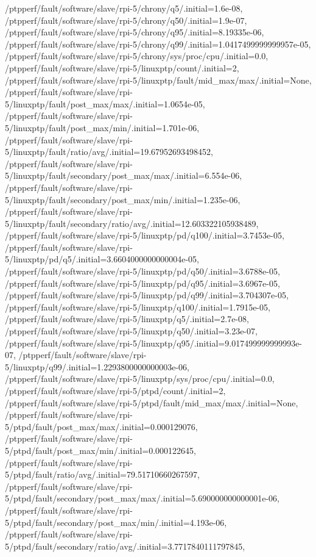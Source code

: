 {    /ptpperf/fault/software/slave/rpi-5/chrony/q5/.initial=1.6e-08,
    /ptpperf/fault/software/slave/rpi-5/chrony/q50/.initial=1.9e-07,
    /ptpperf/fault/software/slave/rpi-5/chrony/q95/.initial=8.19335e-06,
    /ptpperf/fault/software/slave/rpi-5/chrony/q99/.initial=1.0417499999999957e-05,
    /ptpperf/fault/software/slave/rpi-5/chrony/sys/proc/cpu/.initial=0.0,
    /ptpperf/fault/software/slave/rpi-5/linuxptp/count/.initial=2,
    /ptpperf/fault/software/slave/rpi-5/linuxptp/fault/mid_max/max/.initial=None,
    /ptpperf/fault/software/slave/rpi-5/linuxptp/fault/post_max/max/.initial=1.0654e-05,
    /ptpperf/fault/software/slave/rpi-5/linuxptp/fault/post_max/min/.initial=1.701e-06,
    /ptpperf/fault/software/slave/rpi-5/linuxptp/fault/ratio/avg/.initial=19.67952693498452,
    /ptpperf/fault/software/slave/rpi-5/linuxptp/fault/secondary/post_max/max/.initial=6.554e-06,
    /ptpperf/fault/software/slave/rpi-5/linuxptp/fault/secondary/post_max/min/.initial=1.235e-06,
    /ptpperf/fault/software/slave/rpi-5/linuxptp/fault/secondary/ratio/avg/.initial=12.603322105938489,
    /ptpperf/fault/software/slave/rpi-5/linuxptp/pd/q100/.initial=3.7453e-05,
    /ptpperf/fault/software/slave/rpi-5/linuxptp/pd/q5/.initial=3.6604000000000004e-05,
    /ptpperf/fault/software/slave/rpi-5/linuxptp/pd/q50/.initial=3.6788e-05,
    /ptpperf/fault/software/slave/rpi-5/linuxptp/pd/q95/.initial=3.6967e-05,
    /ptpperf/fault/software/slave/rpi-5/linuxptp/pd/q99/.initial=3.704307e-05,
    /ptpperf/fault/software/slave/rpi-5/linuxptp/q100/.initial=1.7915e-05,
    /ptpperf/fault/software/slave/rpi-5/linuxptp/q5/.initial=2.7e-08,
    /ptpperf/fault/software/slave/rpi-5/linuxptp/q50/.initial=3.23e-07,
    /ptpperf/fault/software/slave/rpi-5/linuxptp/q95/.initial=9.017499999999993e-07,
    /ptpperf/fault/software/slave/rpi-5/linuxptp/q99/.initial=1.2293800000000003e-06,
    /ptpperf/fault/software/slave/rpi-5/linuxptp/sys/proc/cpu/.initial=0.0,
    /ptpperf/fault/software/slave/rpi-5/ptpd/count/.initial=2,
    /ptpperf/fault/software/slave/rpi-5/ptpd/fault/mid_max/max/.initial=None,
    /ptpperf/fault/software/slave/rpi-5/ptpd/fault/post_max/max/.initial=0.000129076,
    /ptpperf/fault/software/slave/rpi-5/ptpd/fault/post_max/min/.initial=0.000122645,
    /ptpperf/fault/software/slave/rpi-5/ptpd/fault/ratio/avg/.initial=79.51710660267597,
    /ptpperf/fault/software/slave/rpi-5/ptpd/fault/secondary/post_max/max/.initial=5.690000000000001e-06,
    /ptpperf/fault/software/slave/rpi-5/ptpd/fault/secondary/post_max/min/.initial=4.193e-06,
    /ptpperf/fault/software/slave/rpi-5/ptpd/fault/secondary/ratio/avg/.initial=3.7717840111797845,
}
